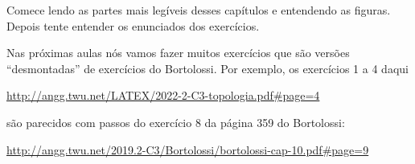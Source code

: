 \documentclass[oneside,12pt]{article}
\begin{document}
{{\msk

Comece lendo as partes mais legíveis desses capítulos e entendendo as
figu\-ras. Depois tente entender os enunciados dos exercícios.

\msk

Nas próximas aulas nós vamos fazer muitos exercícios que são versões
``desmontadas'' de exercícios do Bortolossi. Por exemplo, os
exercícios 1 a 4 daqui

\ssk

{\footnotesize

\url{http://angg.twu.net/LATEX/2022-2-C3-topologia.pdf\#page=4}

}

\ssk

são parecidos com passos do exercício 8 da página 359 do Bortolossi:

\ssk

{\footnotesize

\url{http://angg.twu.net/2019.2-C3/Bortolossi/bortolossi-cap-10.pdf\#page=9}

}


}\anothercol{
}}








\end{document}
